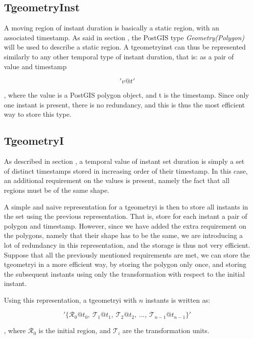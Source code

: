 \subsection{TgeometryInst}

A moving region of instant duration is basically a static region, with an associated timestamp. As said in section , the PostGIS type \textit{Geometry(Polygon)} will be used to describe a static region. A tgeometryinst can thus be represented similarly to any other temporal type of instant duration, that is: as a pair of value and timestamp

\[
    'v@t'
\]

, where the value is a PostGIS polygon object, and t is the timestamp. Since only one instant is present, there is no redundancy, and this is thus the most efficient way to store this type.

\subsection{TgeometryI}

As described in section , a temporal value of instant set duration is simply a set of distinct timestamps stored in increasing order of their timestamp. In this case, an additional requirement on the values is present, namely the fact that all regions must be of the same shape.

A simple and naive representation for a tgeometryi is then to store all instants in the set using the previous representation. That is, store for each instant a pair of polygon and timestamp. However, since we have added the extra requirement on the polygons, namely that their shape has to be the same, we are introducing a lot of redundancy in this representation, and the storage is thus not very efficient. \\

Suppose that all the previously mentioned requirements are met, we can store the tgeometryi in a more efficient way, by storing the polygon only once, and storing the subsequent instants using only the transformation with respect to the initial instant. 

Using this representation, a tgeometryi with $n$ instants is written as:

\[
    '\{\mathcal{R}_0@t_0,\ \mathcal{T}_1@t_1,\ \mathcal{T}_2@t_2,\ ..., \ \mathcal{T}_{n-1}@t_{n-1}\}'
\]

, where $\mathcal{R}_0$ is the initial region, and $\mathcal{T}_i$ are the transformation units. \\


